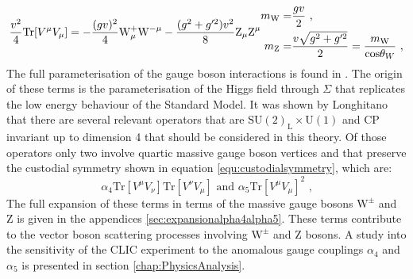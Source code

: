 %
\begin{equation}
\frac{v^{2}}{4}\text{Tr}[V^{\mu}V_{\mu}] = - \frac{(gv)^{2}}{4} \text{W}^{+}_{\mu} \text{W}^{-\mu} - \frac{(g^{2} + g'^{2})v^{2}}{8} \text{Z}_{\mu} \text{Z}^{\mu} \\
\begin{aligned}
m_{\text{W}} = & \frac{gv}{2} \text{ ,} \\
m_{\text{Z}} = & \frac{v\sqrt{g^{2} + g'^{2}}}{2} = \frac{m_{\text{W}}}{\text{cos}{\theta_{W}}} \text{ ,}
\end{aligned}
\end{equation}
%
\noindent The full parameterisation of the gauge boson interactions is found in \cite{Herrero:1994tj}.  The origin of these terms is the parameterisation of the Higgs field through $\Sigma$ that replicates the low energy behaviour of the Standard Model.  It was shown by Longhitano \cite{Longhitano:1980tm} that there are several relevant operators that are $\text{SU}(2)_{\text{L}} \times \text{U}(1)$ and CP invariant up to dimension 4 that should be considered in this theory.  Of those operators only two involve quartic massive gauge boson vertices and that preserve the custodial symmetry \cite{Belyaev:354051} shown in equation \ref{equ:custodialsymmetry}, which are:
%
\begin{equation}
\alpha_{4}\text{Tr}[V^{\mu}V_{\nu}]\text{Tr}[V^{\nu}V_{\mu}] \text{ and } \alpha_{5}\text{Tr}[V^{\mu}V_{\mu}]^{2} \text{ ,}
\end{equation}
%
\noindent The full expansion of these terms in terms of the massive gauge bosons $\text{W}^{\pm}$ and Z is given in the appendices \ref{sec:expansionalpha4alpha5}.  These terms contribute to the vector boson scattering processes involving $\text{W}^{\pm}$ and Z bosons.  A study into the sensitivity of the CLIC experiment to the anomalous gauge couplings $\alpha_{4}$ and $\alpha_{5}$ is presented in section \ref{chap:PhysicsAnalysis}.



